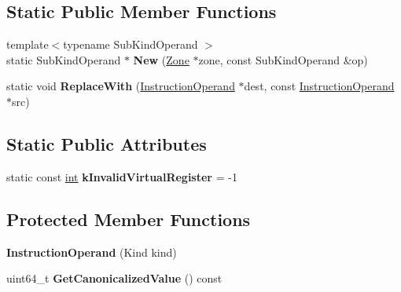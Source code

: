 \subsection*{Static Public Member Functions}
\begin{DoxyCompactItemize}
\item 
\mbox{\label{classv8_1_1internal_1_1compiler_1_1InstructionOperand_aae307b8218d280dd4346cb64791064f6}} 
{\footnotesize template$<$typename Sub\+Kind\+Operand $>$ }\\static Sub\+Kind\+Operand $\ast$ {\bfseries New} (\mbox{\hyperlink{classv8_1_1internal_1_1Zone}{Zone}} $\ast$zone, const Sub\+Kind\+Operand \&op)
\item 
\mbox{\label{classv8_1_1internal_1_1compiler_1_1InstructionOperand_a15887ba6659295069e44ae205b48a982}} 
static void {\bfseries Replace\+With} (\mbox{\hyperlink{classv8_1_1internal_1_1compiler_1_1InstructionOperand}{Instruction\+Operand}} $\ast$dest, const \mbox{\hyperlink{classv8_1_1internal_1_1compiler_1_1InstructionOperand}{Instruction\+Operand}} $\ast$src)
\end{DoxyCompactItemize}
\subsection*{Static Public Attributes}
\begin{DoxyCompactItemize}
\item 
\mbox{\label{classv8_1_1internal_1_1compiler_1_1InstructionOperand_acbe2539e980eb4f4522519b5e01c7fda}} 
static const \mbox{\hyperlink{classint}{int}} {\bfseries k\+Invalid\+Virtual\+Register} = -\/1
\end{DoxyCompactItemize}
\subsection*{Protected Member Functions}
\begin{DoxyCompactItemize}
\item 
\mbox{\label{classv8_1_1internal_1_1compiler_1_1InstructionOperand_a1af29902564946c9def77d52efc0b28f}} 
{\bfseries Instruction\+Operand} (Kind kind)
\item 
\mbox{\label{classv8_1_1internal_1_1compiler_1_1InstructionOperand_a94c13c0048e324c7b33e2622a7db35ee}} 
uint64\+\_\+t {\bfseries Get\+Canonicalized\+Value} () const
\end{DoxyCompactItemize}
